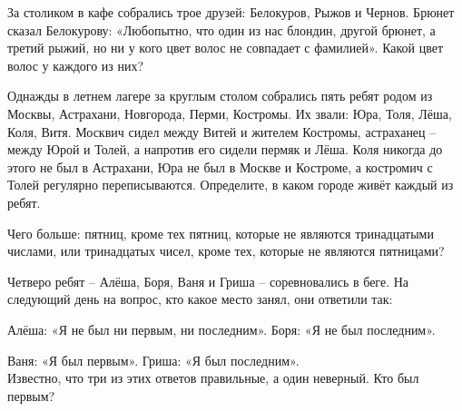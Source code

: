 
\begin{thm}
    За столиком в кафе собрались трое друзей: Белокуров, Рыжов и Чернов. Брюнет сказал Белокурову: «Любопытно, что один из нас блондин, другой брюнет, а третий рыжий, но ни у кого цвет волос не совпадает с фамилией». Какой цвет волос у каждого из них?
\end{thm}

\begin{thm}
    Однажды в летнем лагере за круглым столом собрались пять ребят родом из Москвы, Астрахани, Новгорода, Перми, Костромы. Их звали: Юра, Толя, Лёша, Коля, Витя. Москвич сидел между Витей и жителем Костромы, астраханец -- между Юрой и Толей, а напротив его сидели пермяк и Лёша. Коля никогда до этого не был в Астрахани, Юра не был в Москве и Костроме, а костромич с Толей регулярно переписываются. Определите, в каком городе живёт каждый из ребят.
\end{thm}

\begin{thm}
    Чего больше: пятниц, кроме тех пятниц, которые не являются тринадцатыми числами, или тринадцатых чисел, кроме тех, которые не являются пятницами?
\end{thm}

\begin{thm}
    Четверо ребят -- Алёша, Боря, Ваня и Гриша -- соревновались в беге. На следующий день на вопрос, кто какое место занял, они ответили так:
\par Алёша: «Я не был ни первым, ни последним». \hfill Боря: «Я не был последним». \par Ваня: «Я был первым». \hfill Гриша: «Я был последним».
\\ Известно, что три из этих ответов правильные, а один неверный. Кто был первым?
\end{thm}